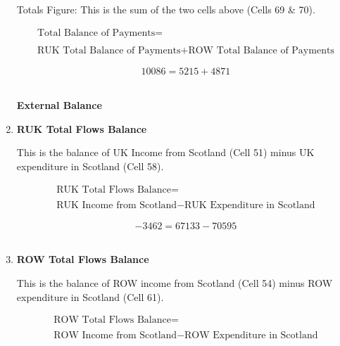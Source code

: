 \begin{enumerate}
Totals Figure: This is the sum of the two cells above (Cells 69 \& 70).

\begin{equation}
\begin{split}
\text{Total Balance of Payments} =  \\ \\
\text{RUK Total Balance of Payments}+\text{ROW Total Balance of Payments}
\end{split} \label{eq:2.5.75}
\end{equation}

\begin{equation} \nonumber
10086 = 5215+4871
\end{equation}\\



\pagebreak

\begin{center}
\textbf{\LARGE External Balance}
\end{center}

\item \textbf {RUK Total Flows Balance}

This is the balance of UK Income from Scotland (Cell 51) minus UK expenditure in Scotland (Cell 58).

\begin{equation}
\begin{split}
\text{RUK Total Flows Balance} =  \\ \\
\text{RUK Income from Scotland}- \text{RUK Expenditure in Scotland}
\end{split} \label{eq:2.5.76}
\end{equation}

\begin{equation} \nonumber
-3462 = 67133-70595
\end{equation}\\


\item \textbf {ROW Total Flows Balance}

This is the balance of ROW income from Scotland (Cell 54) minus ROW expenditure in Scotland (Cell 61).

\begin{equation}
\begin{split}
\text{ROW Total Flows Balance} =  \\ \\
\text{ROW Income from Scotland}- \text{ROW Expenditure in Scotland}
\end{split} \label{eq:2.5.77}
\end{equation}


\end{enumerate}
